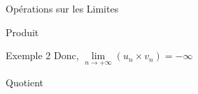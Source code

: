\documentclass{coursbook}
\begin{document}
\begin{Gpartie}{Opérations sur les Limites}
\begin{Spartie}{Produit}
\begin{SSpartie}{Exemple 2}
                Donc, $\lim\limits_{n\to +\infty}(u_n\times v_n)=-\infty$
            \end{SSpartie}
        \end{Spartie}
        \begin{Spartie}{Quotient}
            \begin{table}[H]%
                \centering {}
\end{table}
\end{Spartie}
\end{Gpartie}
\end{document}
